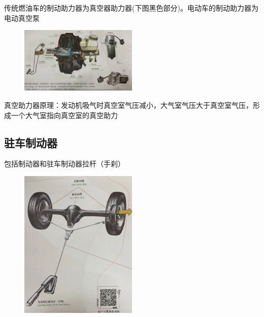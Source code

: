 	传统燃油车的制动助力器为真空器助力器(下图黑色部分)。电动车的制动助力器为电动真空泵
	
	\begin{figure}[htbp]
		\centering
		\includegraphics[width=0.5\textwidth]{3-41}
	\end{figure}
	
	真空助力器原理：发动机吸气时真空室气压减小，大气室气压大于真空室气压，形成一个大气室指向真空室的真空助力
\subsection{驻车制动器}
	包括制动器和驻车制动器拉杆（手刹）
	
	\begin{figure}[htbp]
		\centering
		\includegraphics[width=0.5\textwidth]{3-42}
	\end{figure}
